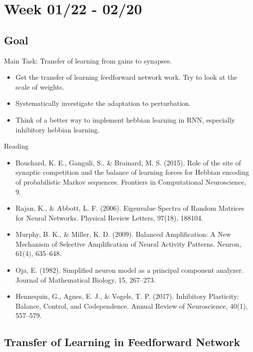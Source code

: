 \documentclass[12pt, a4paper]{article}
\begin{document}

\section*{Week 01/22 - 02/20}

\subsection*{Goal}

\noindent
Main Task: Transfer of learning from gains to synapses.

\begin{itemize}
    \item Get the transfer of learning feedforward network work. Try to look at the scale of weights.
    \item Systematically investigate the adaptation to perturbation.
    \item Think of a better way to implement hebbian learning in RNN, especially inhibitory hebbian learning.
\end{itemize}

\noindent
Reading

\begin{itemize}
    \item Bouchard, K. E., Ganguli, S., \& Brainard, M. S. (2015). Role of the site of synaptic competition and the balance of learning forces for Hebbian encoding of probabilistic Markov sequences. Frontiers in Computational Neuroscience, 9.
    \item Rajan, K., \& Abbott, L. F. (2006). Eigenvalue Spectra of Random Matrices for Neural Networks. Physical Review Letters, 97(18), 188104.
    \item Murphy, B. K., \& Miller, K. D. (2009). Balanced Amplification: A New Mechanism of Selective Amplification of Neural Activity Patterns. Neuron, 61(4), 635–648.
    \item Oja, E. (1982). Simplified neuron model as a principal component analyzer. Journal of Mathematical Biology, 15, 267--273.
    \item Hennequin, G., Agnes, E. J., \& Vogels, T. P. (2017). Inhibitory Plasticity: Balance, Control, and Codependence. Annual Review of Neuroscience, 40(1), 557–579.
\end{itemize}

\newpage

\subsection*{Transfer of Learning in Feedforward Network}
\end{document}
